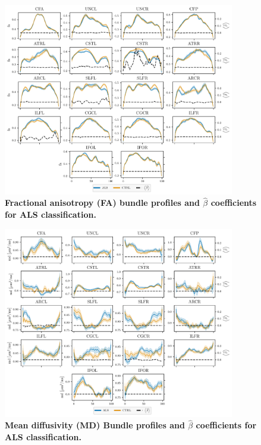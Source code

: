 \documentclass[10pt,letterpaper]{article}
\begin{document}
\begin{figure}
    \includegraphics[width=0.9\textwidth]{sarica_coefs_profiles_fa.pdf}
    \caption{%
        {%
            \bf Fractional anisotropy (FA) bundle profiles and $\hat{\beta}$
            coefficients for ALS classification.
        }
        \label{fig:als-bp:fa}
    }
\end{figure}

\begin{figure}
    \includegraphics[width=0.9\textwidth]{sarica_coefs_profiles_md.pdf}
    \caption{%
        {%
            \bf Mean diffusivity (MD) Bundle profiles and $\hat{\beta}$
            coefficients for ALS classification.
        }
        \label{fig:als-bp:md}
    }
\end{figure}
\end{document}
